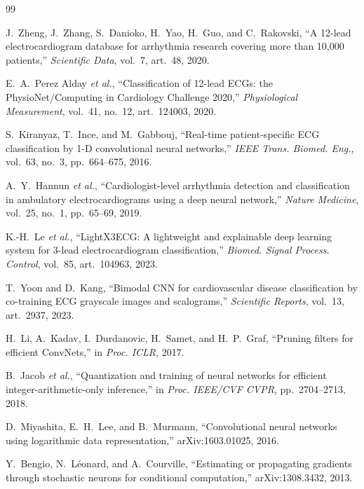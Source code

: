 \documentclass[conference,10pt]{IEEEtran}
\begin{document}
\begin{thebibliography}{99}
\footnotesize

J.~Zheng, J.~Zhang, S.~Danioko, H.~Yao, H.~Guo, and C.~Rakovski, ``A 12-lead
electrocardiogram database for arrhythmia research covering more than 10,000
patients,'' \emph{Scientific Data}, vol.~7, art.~48, 2020.

E.~A.~Perez Alday \emph{et al.}, ``Classification of 12-lead ECGs: the
PhysioNet/Computing in Cardiology Challenge 2020,'' \emph{Physiological
Measurement}, vol.~41, no.~12, art.~124003, 2020.

S.~Kiranyaz, T.~Ince, and M.~Gabbouj, ``Real-time patient-specific ECG
classification by 1-D convolutional neural networks,'' \emph{IEEE Trans. Biomed.
Eng.}, vol.~63, no.~3, pp.~664--675, 2016.

A.~Y.~Hannun \emph{et al.}, ``Cardiologist-level arrhythmia detection and
classification in ambulatory electrocardiograms using a deep neural network,''
\emph{Nature Medicine}, vol.~25, no.~1, pp.~65--69, 2019.

K.-H.~Le \emph{et al.}, ``LightX3ECG: A lightweight and explainable deep learning
system for 3-lead electrocardiogram classification,'' \emph{Biomed. Signal
Process. Control}, vol.~85, art.~104963, 2023.

T.~Yoon and D.~Kang, ``Bimodal CNN for cardiovascular disease classification by
co-training ECG grayscale images and scalograms,'' \emph{Scientific Reports},
vol.~13, art.~2937, 2023.

H.~Li, A.~Kadav, I.~Durdanovic, H.~Samet, and H.~P.~Graf, ``Pruning filters for
efficient ConvNets,'' in \emph{Proc. ICLR}, 2017.

B.~Jacob \emph{et al.}, ``Quantization and training of neural networks for
efficient integer-arithmetic-only inference,'' in \emph{Proc. IEEE/CVF CVPR},
pp.~2704--2713, 2018.

D.~Miyashita, E.~H.~Lee, and B.~Murmann, ``Convolutional neural networks using
logarithmic data representation,'' arXiv:1603.01025, 2016.

Y.~Bengio, N.~L\'eonard, and A.~Courville, ``Estimating or propagating gradients
through stochastic neurons for conditional computation,'' arXiv:1308.3432, 2013.


\end{thebibliography}
\end{document}
